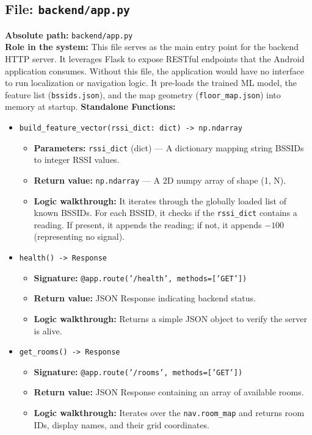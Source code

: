 \documentclass[11pt,a4paper]{article}
\begin{document}
\subsection{File: \texttt{backend/app.py}}
\textbf{Absolute path:} \texttt{backend/app.py}\\
\textbf{Role in the system:} This file serves as the main entry point for the backend HTTP server. It leverages Flask to expose RESTful endpoints that the Android application consumes. Without this file, the application would have no interface to run localization or navigation logic. It pre-loads the trained ML model, the feature list (\texttt{bssids.json}), and the map geometry (\texttt{floor\_map.json}) into memory at startup.
\textbf{Standalone Functions:}
\begin{itemize}
\item \texttt{build\_feature\_vector(rssi\_dict: dict) -> np.ndarray}
\begin{itemize}
\item \textbf{Parameters:} \texttt{rssi\_dict} (dict) --- A dictionary mapping string BSSIDs to integer RSSI values.
\item \textbf{Return value:} \texttt{np.ndarray} --- A 2D numpy array of shape (1, N).
\item \textbf{Logic walkthrough:} It iterates through the globally loaded list of known BSSIDs. For each BSSID, it checks if the \texttt{rssi\_dict} contains a reading. If present, it appends the reading; if not, it appends $-100$ (representing no signal).
\end{itemize}
\item \texttt{health() -> Response}
\begin{itemize}
\item \textbf{Signature:} \texttt{@app.route('/health', methods=['GET'])}
\item \textbf{Return value:} JSON Response indicating backend status.
\item \textbf{Logic walkthrough:} Returns a simple JSON object to verify the server is alive.
\end{itemize}
\item \texttt{get\_rooms() -> Response}
\begin{itemize}
\item \textbf{Signature:} \texttt{@app.route('/rooms', methods=['GET'])}
\item \textbf{Return value:} JSON Response containing an array of available rooms.
\item \textbf{Logic walkthrough:} Iterates over the \texttt{nav.room\_map} and returns room IDs, display names, and their grid coordinates.

\end{itemize}
\end{itemize}
\end{document}
